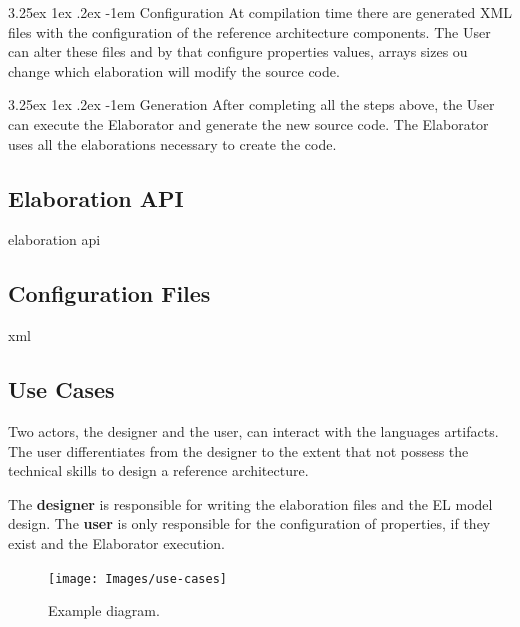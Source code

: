 \documentclass{report}
\makeatletter
\renewcommand\paragraph{\@startsection{paragraph}{5}{\z@}%
	{3.25ex \@plus1ex \@minus.2ex}%
	{-1em}%
	{\normalfont\normalsize\bfseries}}
\makeatother
\begin{document}
		\paragraph{Configuration} At compilation time there are generated XML files with the configuration of the reference architecture components. The User can alter these files and by that configure properties values, arrays sizes ou change which elaboration will modify the source code.

		\paragraph{Generation} After completing all the steps above, the User can execute the Elaborator and generate the new source code. The Elaborator uses all the elaborations necessary to create the code.
		
		\subsection{Elaboration API}
		
		\par elaboration api
		
		\subsection{Configuration Files}
		
		\par xml
		
		\subsection{Use Cases}
		
		\par Two actors, the designer and the user, can interact with the languages artifacts. The user differentiates
		from the designer to the extent that not possess the technical skills to design a reference architecture.
		\par The \textbf{designer} is responsible for writing the elaboration files and the EL model design. The \textbf{user} is only responsible for the configuration of properties, if they exist and the Elaborator execution.
		
		\begin{figure} [H]
			\centering
			\texttt{[image: Images/use-cases]}
			\caption{Example diagram.}
			\label{fig:use-cases}
		\end{figure}
		
\end{document}
